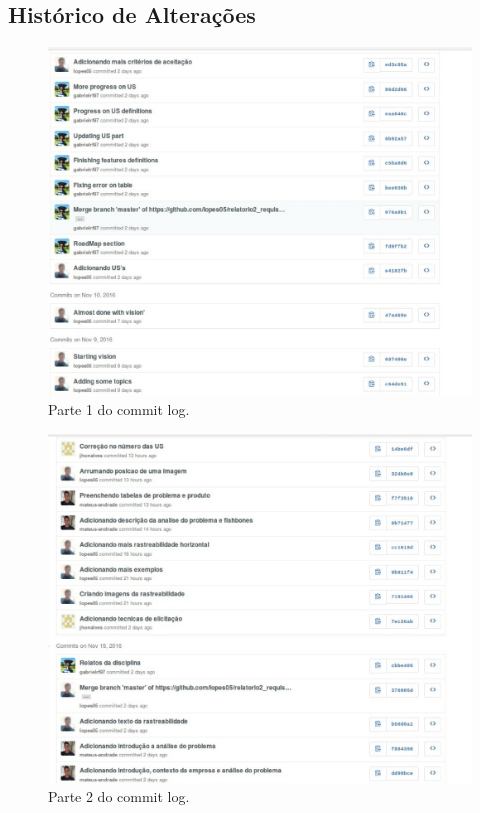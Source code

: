\begin{appendices}
\chapter{Histórico de Alterações}

\begin{figure}[!htpb]
\centering
\includegraphics[scale=0.35]{figuras/cronograma/foto_7_}
\caption{Parte 1 do commit log.}
\end{figure}

\begin{figure}[!htpb]
\centering
\includegraphics[scale=0.35]{figuras/cronograma/foto_9_}
\caption{Parte 2 do commit log.}
\end{figure}


\end{appendices}
